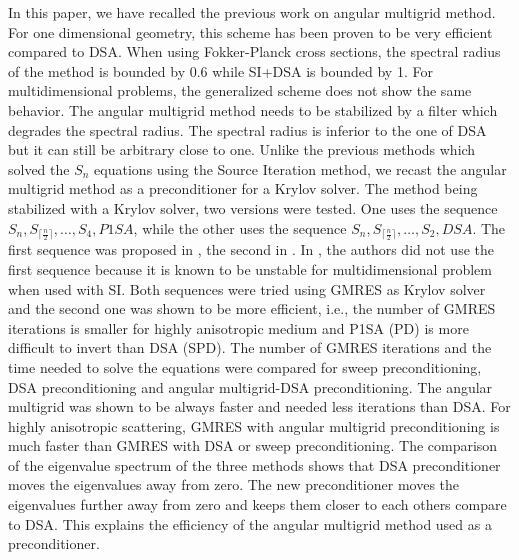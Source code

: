 \documentclass[preprint,10pt]{elsarticle}
\renewcommand{\(}{\left(}
\renewcommand{\)}{\right)}
\renewcommand{\[}{\left[}
\renewcommand{\]}{\right]}
\begin{document}
In this paper, we have recalled the previous work on angular multigrid
method. For one dimensional geometry, this scheme has been proven to be very 
efficient compared to DSA. When using Fokker-Planck cross sections, the
spectral radius of the method is bounded by 0.6 while SI+DSA is bounded by 1. 
For multidimensional problems, the generalized scheme does
not show the same behavior. The angular multigrid method needs to be
stabilized
by a filter which degrades the spectral radius. The spectral radius is inferior 
to the one of DSA but it can still be arbitrary close to one. 
Unlike the previous methods which solved the $S_n$ equations using the Source 
Iteration method, we recast the angular multigrid method as a preconditioner 
for a Krylov solver. The method being stabilized with a Krylov solver, two 
versions were tested. One uses the sequence $S_n,S_{\lceil\frac{n}{2}\rceil},
\hdots,S_4,P1SA$, while the other uses the sequence $S_n,
S_{\lceil\frac{n}{2}\rceil},\hdots,S_2,DSA$.
The first sequence was proposed in \cite{multigrid_1d}, the second in 
\cite{multigrid_2d}. In \cite{multigrid_2d}, the authors did not use the first
sequence because it is known to be unstable for multidimensional problem when 
used with SI. Both sequences were tried using GMRES as Krylov solver and the 
second one was shown to be more 
efficient, i.e., the number of GMRES iterations is smaller for highly 
anisotropic medium and P1SA (PD) is more difficult to invert than
DSA (SPD). The number of GMRES iterations and the time needed
to solve the equations were compared for sweep preconditioning, DSA
preconditioning and angular multigrid-DSA preconditioning. The angular
multigrid was shown to be always faster and needed less iterations than DSA.
For highly anisotropic scattering, GMRES with angular multigrid
preconditioning is much faster than GMRES with DSA or sweep preconditioning.
The comparison of the eigenvalue spectrum of the three methods shows that 
DSA preconditioner moves the eigenvalues away from zero. The new
preconditioner moves the eigenvalues further away from zero and keeps them
closer to each others compare to DSA. This explains the
efficiency of the angular multigrid method used as a preconditioner.






\end{document}
